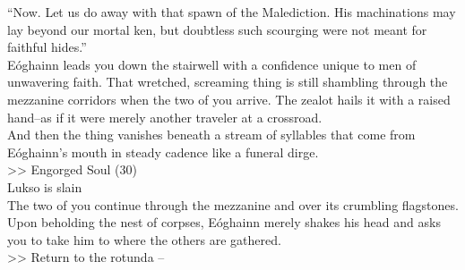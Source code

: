 “Now. Let us do away with that spawn of the Malediction. His machinations may lay beyond our mortal ken, but doubtless such scourging were not meant for faithful hides.”\\

Eóghainn leads you down the stairwell with a confidence unique to men of unwavering faith. That wretched, screaming thing is still shambling through the mezzanine corridors when the two of you arrive. The zealot hails it with a raised hand--as if it were merely another traveler at a crossroad.\\

And then the thing vanishes beneath a stream of syllables that come from Eóghainn’s mouth in steady cadence like a funeral dirge.\\
>> Engorged Soul (30)\\
 Lukso is slain\\

The two of you continue through the mezzanine and over its crumbling flagstones. Upon beholding the nest of corpses, Eóghainn merely shakes his head and asks you to take him to where the others are gathered.\\

>> Return to the rotunda -- 